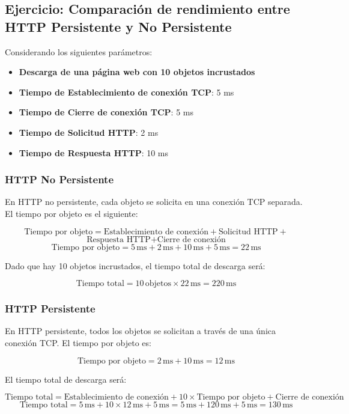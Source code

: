 \documentclass[a4paper,12pt]{article}
\begin{document}
\subsection{Ejercicio: Comparación de rendimiento entre HTTP Persistente y No Persistente}

Considerando los siguientes parámetros:

\begin{itemize}
    \item \textbf{Descarga de una página web con 10 objetos incrustados}
    \item \textbf{Tiempo de Establecimiento de conexión TCP}: 5 ms
    \item \textbf{Tiempo de Cierre de conexión TCP}: 5 ms
    \item \textbf{Tiempo de Solicitud HTTP}: 2 ms
    \item \textbf{Tiempo de Respuesta HTTP}: 10 ms
\end{itemize}
\newpage
\subsubsection{HTTP No Persistente}
En HTTP no persistente, cada objeto se solicita en una conexión TCP separada. El tiempo por objeto es el siguiente:

\[
\text{Tiempo por objeto} = \text{Establecimiento de conexión} + \text{Solicitud HTTP} +
\]
\[
\text{Respuesta HTTP} + \text{Cierre de conexión}
\]
\[
\text{Tiempo por objeto} = 5 \, \text{ms} + 2 \, \text{ms} + 10 \, \text{ms} + 5 \, \text{ms} = 22 \, \text{ms}
\]

Dado que hay 10 objetos incrustados, el tiempo total de descarga será:

\[
\text{Tiempo total} = 10 \, \text{objetos} \times 22 \, \text{ms} = 220 \, \text{ms}
\]

\subsubsection{HTTP Persistente}
En HTTP persistente, todos los objetos se solicitan a través de una única conexión TCP. El tiempo por objeto es:

\[
\text{Tiempo por objeto} = 2 \, \text{ms} + 10 \, \text{ms} = 12 \, \text{ms}
\]

El tiempo total de descarga será:

\[
\text{Tiempo total} = \text{Establecimiento de conexión} + 10 \times \text{Tiempo por objeto} + \text{Cierre de conexión}
\]
\[
\text{Tiempo total} = 5 \, \text{ms} + 10 \times 12 \, \text{ms} + 5 \, \text{ms} = 5 \, \text{ms} + 120 \, \text{ms} + 5 \, \text{ms} = 130 \, \text{ms}
\]
\end{document}
